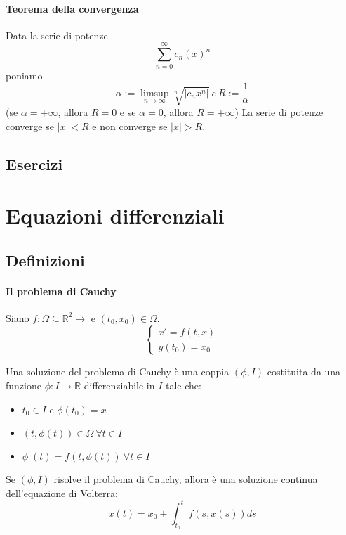 \documentclass[a4paper,12pt]{article}
\begin{document}
\paragraph{Teorema della convergenza}
Data la serie di potenze 
$$ \displaystyle \sum_{n=0}^\infty c_n\left(x\right)^n$$
poniamo $$ \alpha:=\limsup_{n\to \infty} \sqrt[n]{|c_n x^n|} \ e \ R:=\frac{1}{\alpha}$$
(se $\alpha = +\infty$, allora $R=0$ e se $\alpha=0$, allora $R=+\infty$)
La serie di potenze converge se $|x|<R$ e non converge se $|x|>R$.

\subsection{Esercizi}

\section{Equazioni differenziali}

\subsection{Definizioni}
\paragraph{Il problema di Cauchy}
Siano $f:\Omega \subseteq \mathbb{R}^2 \longrightarrow $ e $ \left(t_0,x_0\right) \in \Omega.$ 
$$\label{PC}\begin{cases} x'=f\left(t,x\right) \\ y\left(t_0\right)=x_0 \end{cases}$$

Una soluzione del problema di Cauchy è una coppia $\left( \phi , I \right)$ costituita da una funzione $\phi: I \longrightarrow \mathbb{R}$ differenziabile in $I$ tale che:
\begin{itemize}
\item $t_0 \in I$ e $ \phi\left(t_0\right)=x_0$
\item $ \left(t,\phi\left(t\right)\right) \in \Omega \ \forall t \in I$
\item $ \phi^{'}\left(t \right) = f\left(t,\phi\left(t\right)\right)\ \forall t \in I$
\end{itemize}

Se $\left(\phi,I\right)$ risolve il problema di Cauchy, allora è una soluzione continua dell'equazione di Volterra:
$$ x\left(t\right) = x_0 + \displaystyle\int^t_{t_0} f\left(s,x\left(s\right)\right) ds $$
\end{document}
